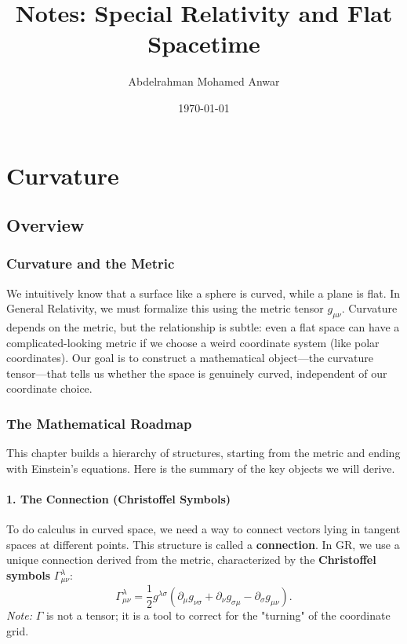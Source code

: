 \documentclass[11pt, a4paper]{report}
\title{Notes: Special Relativity and Flat Spacetime}
\author{Abdelrahman Mohamed Anwar}
\date{\today}
\begin{document}
\tableofcontents
\newpage

\chapter{Curvature}
\section{Overview}

\subsection*{Curvature and the Metric}
We intuitively know that a surface like a sphere is curved, while a plane is flat. In General Relativity, we must formalize this using the metric tensor \(g_{\mu\nu}\). Curvature depends on the metric, but the relationship is subtle: even a flat space can have a complicated-looking metric if we choose a weird coordinate system (like polar coordinates). Our goal is to construct a mathematical object—the curvature tensor—that tells us whether the space is genuinely curved, independent of our coordinate choice.

\subsection*{The Mathematical Roadmap}
This chapter builds a hierarchy of structures, starting from the metric and ending with Einstein's equations. Here is the summary of the key objects we will derive.

\subsubsection*{1. The Connection (Christoffel Symbols)}
To do calculus in curved space, we need a way to connect vectors lying in tangent spaces at different points. This structure is called a \textbf{connection}. In GR, we use a unique connection derived from the metric, characterized by the \textbf{Christoffel symbols} \(\Gamma^\lambda_{\mu\nu}\):
\begin{equation}
\label{eq:christoffel_preview}
\Gamma_{\mu\nu}^{\lambda} = \frac{1}{2}g^{\lambda\sigma} (\partial_{\mu}g_{\nu\sigma} + \partial_{\nu}g_{\sigma\mu} - \partial_{\sigma}g_{\mu\nu}).
\end{equation}
\emph{Note:} \(\Gamma\) is not a tensor; it is a tool to correct for the "turning" of the coordinate grid.
\end{document}
